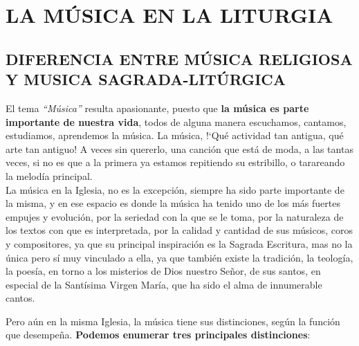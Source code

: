 \documentclass[letterpaper, 12pt]{book}
\begin{document}
    \part{LA M\'USICA EN LA LITURGIA}
    
    \chapter{DIFERENCIA ENTRE M\'USICA RELIGIOSA Y MUSICA        SAGRADA-LIT\'URGICA}
    El tema \textit{``M\'usica''} resulta apasionante, puesto que \textbf{la m\'usica es parte importante de nuestra vida}, todos de alguna manera escuchamos, cantamos, estudiamos, aprendemos la m\'usica. La m\'usica, !`Qu\'e actividad tan antigua, qu\'e arte tan antiguo! A veces sin quererlo, una canci\'on que est\'a de moda, a las tantas veces, si no es que a la primera ya estamos repitiendo su estribillo, o tarareando la melod\'ia principal.\\
    La m\'usica en la Iglesia, no es la excepci\'on, siempre ha sido parte importante de la misma, y en ese espacio es donde la m\'usica ha tenido uno de los m\'as fuertes empujes y evoluci\'on, por la seriedad con la que se le toma, por la naturaleza de los textos con que es interpretada, por la calidad y cantidad de sus m\'usicos, coros y compositores, ya que su principal inspiraci\'on es la Sagrada Escritura, mas no la única pero s\'i muy vinculado a ella, ya que tambi\'en existe la tradici\'on, la teolog\'ia, la poes\'ia, en torno a los misterios de Dios nuestro Se\~nor, de sus santos, en especial de la Sant\'isima Virgen Mar\'ia, que ha sido el alma de innumerable cantos.\newline
    
    Pero a\'un en la misma Iglesia, la m\'usica tiene sus distinciones, seg\'un la funci\'on que desempe\~na. \textbf{Podemos enumerar tres principales distinciones}:
    
\end{document}
